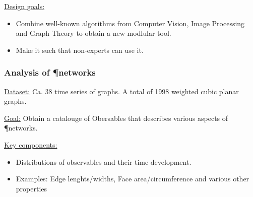 \documentclass[	hyperref={pdfpagelabels=false}, xcolor=dvipsnames,
		11pt]{beamer}
\begin{document}
\begin{frame}
\begin{columns}
\begin{column}{3cm}
\begin{overprint}
{\begin{minipage}[t]{5 cm}
\begin{figure}[h]
	\end{figure}
	     \end{minipage} }

	\end{overprint}
	\end{column}
	\end{columns}

	\vspace{-0.75cm}

		\begin{alertblock}{\underline{Design goals:}}
		\begin{itemize}
		  	\item Combine well-known algorithms from Computer Vision, Image Processing and Graph Theory to obtain a new modlular tool.
		  	\item Make it such that non-experts can use it.
		\end{itemize}
		\end{alertblock}
\end{frame}

\begin{frame}
    \frametitle{Analysis of \P networks} 

	\underline{Dataset:} Ca. 38 time series of graphs. A total of 1998 weighted cubic planar graphs.

	\underline{Goal:} Obtain a catalouge of Obersables that describes various aspects of \P networks.
	
	\begin{block}{\underline{Key components:}}
	 \begin{itemize}
	  \item Distributions of observables and their time development.
	  \item Examples: Edge lenghts/widths, Face area/circumference and various other properties
	 \end{itemize}
	\end{block}
\end{frame}
\end{document}
